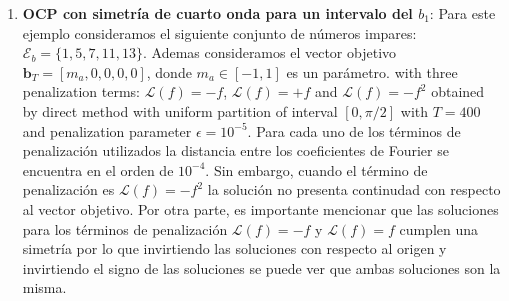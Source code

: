 \begin{enumerate}
    \item \textbf{OCP con simetría de cuarto onda para un intervalo del $b_1$}: Para este ejemplo consideramos el siguiente conjunto de números impares: $\mathcal{E}_b = \{1,5,7,11,13\}$. 
    Ademas consideramos el vector objetivo $\bm{b}_T = [m_a,0,0,0,0]$, donde  $m_a \in [-1,1]$ es un parámetro. with three penalization terms: $\mathcal{L}(f) = -f$, $\mathcal{L}(f) = +f$ and $\mathcal{L}(f) = -f^2$ obtained by direct method with uniform partition of interval $[0,\pi/2]$ with $T=400$ and penalization parameter $\epsilon = 10^{-5}$. 
    Para cada uno de los términos de penalización utilizados la distancia entre los coeficientes de Fourier se encuentra en el orden de $10^{-4}$. 
    Sin embargo, cuando el término de penalización es $\mathcal{L}(f)= -f^2$ la solución no presenta continudad con respecto al vector objetivo. 
    Por otra parte, es importante mencionar que las soluciones para los términos de penalización $\mathcal{L}(f) = -f$ y $\mathcal{L}(f) = f$ cumplen una simetría por lo que invirtiendo las soluciones con respecto al origen y invirtiendo el signo de las soluciones se puede ver que ambas soluciones son la misma.


\end{enumerate}
